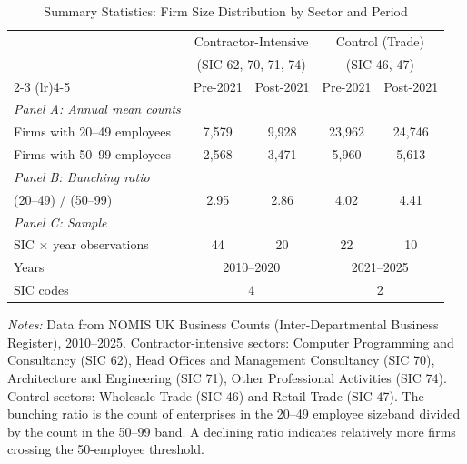 \begin{table}[htbp]
\centering
\caption{Summary Statistics: Firm Size Distribution by Sector and Period}
\label{tab:summary}
\begin{tabular}{lcccc}
\hline\hline
 & \multicolumn{2}{c}{Contractor-Intensive} & \multicolumn{2}{c}{Control (Trade)} \\
 & \multicolumn{2}{c}{(SIC 62, 70, 71, 74)} & \multicolumn{2}{c}{(SIC 46, 47)} \\
\cmidrule(lr){2-3} \cmidrule(lr){4-5}
 & Pre-2021 & Post-2021 & Pre-2021 & Post-2021 \\
\hline
\textit{Panel A: Annual mean counts} & & & & \\[3pt]
Firms with 20--49 employees & 7,579 & 9,928 & 23,962 & 24,746 \\
Firms with 50--99 employees & 2,568 & 3,471 & 5,960 & 5,613 \\[6pt]
\textit{Panel B: Bunching ratio} & & & & \\[3pt]
(20--49) / (50--99) & 2.95 & 2.86 & 4.02 & 4.41 \\[6pt]
\textit{Panel C: Sample} & & & & \\[3pt]
SIC $\times$ year observations & 44 & 20 & 22 & 10 \\
Years & \multicolumn{2}{c}{2010--2020} & \multicolumn{2}{c}{2021--2025} \\
SIC codes & \multicolumn{2}{c}{4} & \multicolumn{2}{c}{2} \\
\hline\hline
\end{tabular}
\begin{tablenotes}
\item \textit{Notes:} Data from NOMIS UK Business Counts (Inter-Departmental Business Register), 2010--2025. Contractor-intensive sectors: Computer Programming and Consultancy (SIC 62), Head Offices and Management Consultancy (SIC 70), Architecture and Engineering (SIC 71), Other Professional Activities (SIC 74). Control sectors: Wholesale Trade (SIC 46) and Retail Trade (SIC 47). The bunching ratio is the count of enterprises in the 20--49 employee sizeband divided by the count in the 50--99 band. A declining ratio indicates relatively more firms crossing the 50-employee threshold.
\end{tablenotes}
\end{table}
